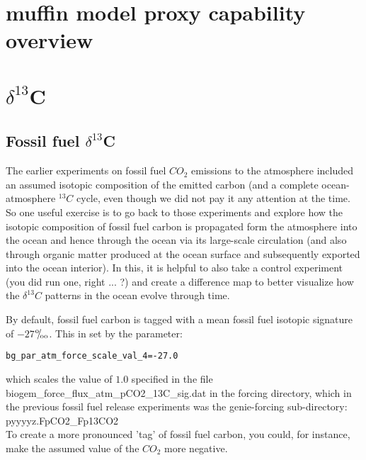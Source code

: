 \documentclass[11pt,fleqn]{book} %
\def\permille{\ensuremath{{}^\text{o}\mkern-5mu/\mkern-3mu_\text{oo}}}
\begin{document}

\newpage


\section{muffin model proxy capability overview}






\newpage


\section{$\delta^{13}$C}


\subsection{Fossil fuel $\delta^{13}$C}

The earlier experiments on fossil fuel \(CO_{2}\) emissions to the atmosphere included an assumed isotopic composition of the emitted carbon (and a complete ocean-atmosphere \(^{13}C\) cycle, even though we did not pay it any attention at the time. So one useful exercise is to go back to those experiments and explore how the  isotopic composition of fossil fuel carbon is propagated form the atmosphere into the ocean and hence through the ocean via its large-scale circulation (and also through organic matter produced at the ocean surface and subsequently exported into the ocean interior). In this, it is helpful to also take a control experiment (you did run one, right ... ?) and create a difference map to better visualize how the \(\delta^{13}C\) patterns in the ocean evolve through time.

By default, fossil fuel carbon is tagged with a mean fossil fuel isotopic signature of \(-27\)\permille. This in set by the parameter:
\vspace{-1mm}\begin{verbatim}
bg_par_atm_force_scale_val_4=-27.0
\end{verbatim}\vspace{-1mm}
which scales the value of \(1.0\) specified in the file \textsf{\footnotesize biogem\_force\_flux\_atm\_pCO2\_13C\_sig.dat} in the forcing directory, which in the previous fossil fuel release experiments was the \textsf{\footnotesize genie-forcing} sub-directory:
\vspace{2pt}
\\\noindent \footnotesize\textsf{pyyyyz.FpCO2\_Fp13CO2}\normalsize
\vspace{2pt}
\\To create a more pronounced 'tag' of fossil fuel carbon, you could, for instance, make the assumed value of the \(CO_{2}\) more negative.
\end{document}
